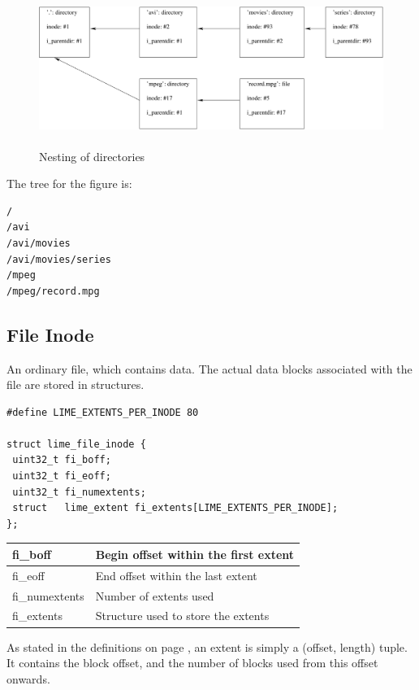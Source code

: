 \begin{figure}[h]
\includegraphics[height=5cm]{dir}
\caption{Nesting of directories}
\end{figure}

The tree for the figure is:

\begin{verbatim}
/
/avi
/avi/movies
/avi/movies/series
/mpeg
/mpeg/record.mpg
\end{verbatim}

\subsection{File Inode}
\label{fileinode}

An ordinary file, which contains data. The actual data blocks associated with the file are stored in  structures.

\begin{verbatim}
#define LIME_EXTENTS_PER_INODE 80

struct lime_file_inode {
 uint32_t fi_boff;
 uint32_t fi_eoff;
 uint32_t fi_numextents;
 struct   lime_extent fi_extents[LIME_EXTENTS_PER_INODE];
};
\end{verbatim}

\begin{tabularx}{\textwidth}{|l|X|}
\hline
fi\_boff&Begin offset within the first extent \\
\hline
fi\_eoff&End offset within the last extent \\
\hline
fi\_numextents&Number of extents used \\
\hline
fi\_extents&Structure used to store the extents \\
\hline
\end{tabularx}

As stated in the definitions on page \pageref{defs}, an extent is simply a (offset, length) tuple. It contains the block offset, and the number of blocks used from this offset onwards.

